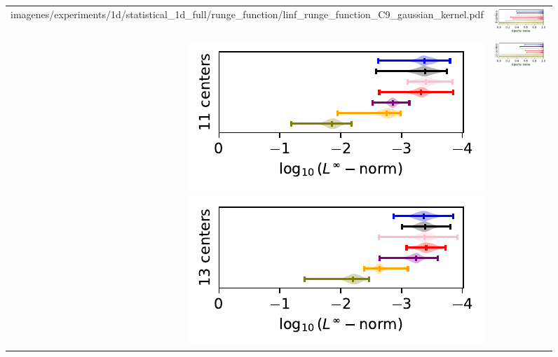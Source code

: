 \documentclass[12pt]{report} %
\begin{document}
\begin{figure}[H]
\begin{tabular}{rl}
{    {imagenes/experiments/1d/statistical_1d_full/runge_function/linf_runge_function_C9_gaussian_kernel.pdf}}  & 
    {\includegraphics[width=.44\textwidth, trim={.7cm 1.15cm 0 0},clip=true]
        {imagenes/experiments/1d/statistical_1d_full/runge_function/epochs_runge_function_C9_gaussian_kernel.pdf}}
    \\
    {\includegraphics[width=.5\textwidth, trim={0 1.25cm 0 0},clip=true]
    {imagenes/experiments/1d/statistical_1d_full/runge_function/linf_runge_function_C11_gaussian_kernel.pdf}} & 
    {\includegraphics[width=.44\textwidth, trim={.7cm 1.15cm 0 0},clip=true]
    {imagenes/experiments/1d/statistical_1d_full/runge_function/epochs_runge_function_C11_gaussian_kernel.pdf}}                                                                                     \\
    {\includegraphics[width=.5\textwidth, trim={0 1.25cm 0 0},clip=true]
    {imagenes/experiments/1d/statistical_1d_full/runge_function/linf_runge_function_C13_gaussian_kernel.pdf}} & 
    {\includegraphics[width=.44\textwidth, trim={.7cm 1.15cm 0 0},clip=true]
}
\end{tabular}
\end{figure}
\end{document}
